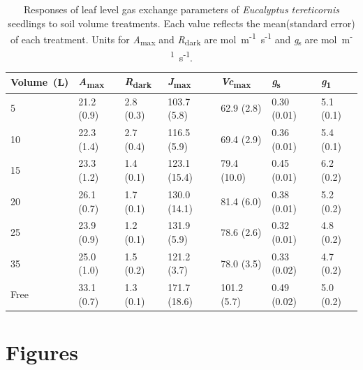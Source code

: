 \documentclass[a4paper]{article}\usepackage[]{graphicx}\usepackage[]{color}
\begin{document}
\begin{table}
\centering
\caption{Responses of leaf level gas exchange parameters of \textit{Eucalyptus tereticornis} seedlings to soil volume treatments. Each value reflects the mean(standard error) of each treatment. Units for \textit{A}\textsubscript{max} and \textit{R}\textsubscript{dark} are {\textmugreek}mol~m\textsuperscript{-1}~s\textsuperscript{-1} and \textit{g}\textsubscript{s} are mol~m\textsuperscript{-1}~s\textsuperscript{-1}.} 
\label{table:Table2}
\begin{tabular}{lllllll}
  \hline
Volume~(L) & \textit{A}\textsubscript{max} & \textit{R}\textsubscript{dark} & \textit{J}\textsubscript{max} & \textit{Vc}\textsubscript{max} & \textit{g}\textsubscript{s} & \textit{g}\textsubscript{1} \\ 
  \hline
5 & 21.2 (0.9) & 2.8 (0.3) & 103.7 (5.8) & 62.9 (2.8) & 0.30 (0.01) & 5.1 (0.1) \\ 
  10 & 22.3 (1.4) & 2.7 (0.4) & 116.5 (5.9) & 69.4 (2.9) & 0.36 (0.01) & 5.4 (0.1) \\ 
  15 & 23.3 (1.2) & 1.4 (0.1) & 123.1 (15.4) & 79.4 (10.0) & 0.45 (0.01) & 6.2 (0.2) \\ 
  20 & 26.1 (0.7) & 1.7 (0.1) & 130.0 (14.1) & 81.4 (6.0) & 0.38 (0.01) & 5.2 (0.2) \\ 
  25 & 23.9 (0.9) & 1.2 (0.1) & 131.9 (5.9) & 78.6 (2.6) & 0.32 (0.01) & 4.8 (0.2) \\ 
  35 & 25.0 (1.0) & 1.5 (0.2) & 121.2 (3.7) & 78.0 (3.5) & 0.33 (0.02) & 4.7 (0.2) \\ 
  Free & 33.1 (0.7) & 1.3 (0.1) & 171.7 (18.6) & 101.2 (5.7) & 0.49 (0.02) & 5.0 (0.2) \\ 
   \hline
\end{tabular}
\end{table}




\clearpage
\section*{Figures}
\end{document}
